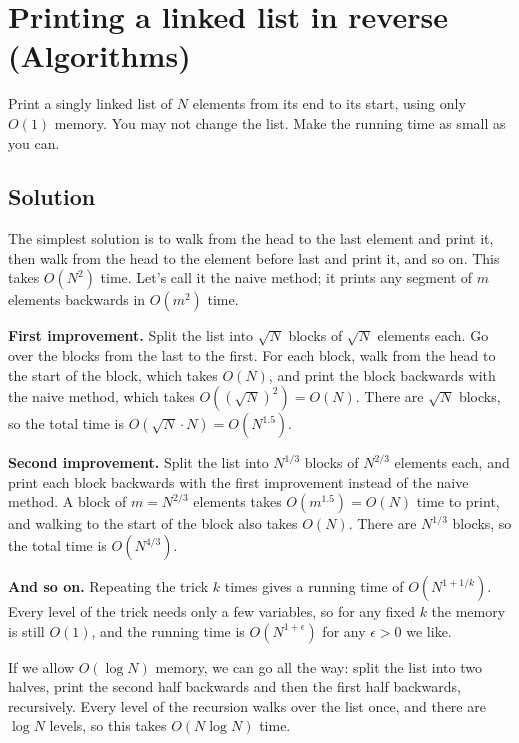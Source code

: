 \section {Printing a linked list in reverse (Algorithms)}

Print a singly linked list of $N$ elements from its end to its start, using only $O(1)$ memory.
You may not change the list. Make the running time as small as you can.

\subsection{Solution}

The simplest solution is to walk from the head to the last element and print it, then walk from the head to the element before last and print it,
and so on. This takes $O(N^2)$ time. Let's call it the naive method; it prints any segment of $m$ elements backwards in $O(m^2)$ time.

\textbf{First improvement.} Split the list into $\sqrt{N}$ blocks of $\sqrt{N}$ elements each.
Go over the blocks from the last to the first. For each block, walk from the head to the start of the block, which takes $O(N)$,
and print the block backwards with the naive method, which takes $O((\sqrt{N})^2) = O(N)$.
There are $\sqrt{N}$ blocks, so the total time is $O(\sqrt{N} \cdot N) = O(N^{1.5})$.

\textbf{Second improvement.} Split the list into $N^{1/3}$ blocks of $N^{2/3}$ elements each,
and print each block backwards with the first improvement instead of the naive method.
A block of $m = N^{2/3}$ elements takes $O(m^{1.5}) = O(N)$ time to print, and walking to the start of the block also takes $O(N)$.
There are $N^{1/3}$ blocks, so the total time is $O(N^{4/3})$.

\textbf{And so on.} Repeating the trick $k$ times gives a running time of $O(N^{1+1/k})$.
Every level of the trick needs only a few variables, so for any fixed $k$ the memory is still $O(1)$,
and the running time is $O(N^{1+\epsilon})$ for any $\epsilon > 0$ we like.

If we allow $O(\log N)$ memory, we can go all the way: split the list into two halves, print the second half backwards and then the first half backwards,
recursively. Every level of the recursion walks over the list once, and there are $\log N$ levels, so this takes $O(N \log N)$ time.
